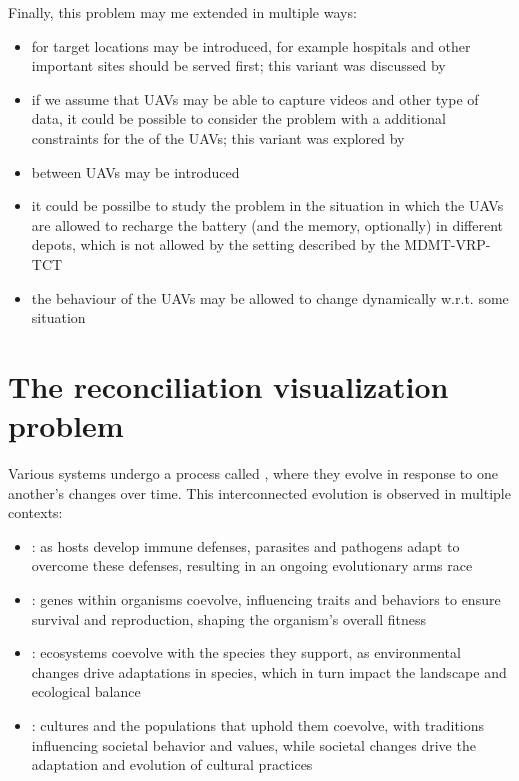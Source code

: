\documentclass[a4paper, 12pt]{report}
\begin{document}
    Finally, this problem may me extended in multiple ways:

    \begin{itemize}
        \item {} for target locations may be introduced, for example hospitals and other important sites should be served first; this variant was discussed by \textcite{calamoneri2}
        \item if we assume that UAVs may be able to capture videos and other type of data, it could be possible to consider the problem with a additional constraints for the  of the UAVs; this variant was explored by \textcite{sorbelli}
        \item {} between UAVs may be introduced
        \item it could be possilbe to study the problem in the situation in which the UAVs are allowed to recharge the battery (and the memory, optionally) in different depots, which is not allowed by the setting described by the MDMT-VRP-TCT
        \item the behaviour of the UAVs may be allowed to change dynamically w.r.t. some  situation
    \end{itemize}

    \chapter{The reconciliation visualization problem}

    Various systems undergo a process called , where they evolve in response to one another's changes over time. This interconnected evolution is observed in multiple contexts:

    \begin{itemize}
        \item {}: as hosts develop immune defenses, parasites and pathogens adapt to overcome these defenses, resulting in an ongoing evolutionary arms race
        \item {}: genes within organisms coevolve, influencing traits and behaviors to ensure survival and reproduction, shaping the organism's overall fitness
        \item {}: ecosystems coevolve with the species they support, as environmental changes drive adaptations in species, which in turn impact the landscape and ecological balance
        \item {}: cultures and the populations that uphold them coevolve, with traditions influencing societal behavior and values, while societal changes drive the adaptation and evolution of cultural practices
    \end{itemize}
\end{document}
